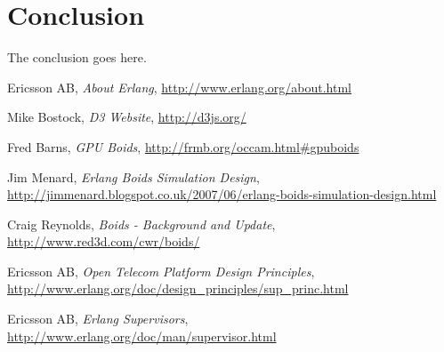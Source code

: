 \documentclass[10pt, a4paper, conference, compsocconf]{IEEEtran}
\begin{document}




\section{Conclusion}
The conclusion goes here.


%
%
%
\begin{thebibliography}{1}


    Ericsson AB,
    \emph{About Erlang},
    \url{http://www.erlang.org/about.html}

    Mike Bostock,
    \emph{D3 Website},
    \url{http://d3js.org/}

    Fred Barns,
    \emph{GPU Boids},
    \url{http://frmb.org/occam.html#gpuboids}

    Jim Menard,
    \emph{Erlang Boids Simulation Design},
    \url{http://jimmenard.blogspot.co.uk/2007/06/erlang-boids-simulation-design.html}

    Craig Reynolds,
    \emph{Boids - Background and Update},
    \url{http://www.red3d.com/cwr/boids/}

    Ericsson AB,
	\emph{Open Telecom Platform Design Principles},
    \url{http://www.erlang.org/doc/design_principles/sup_princ.html}

    Ericsson AB,
	\emph{Erlang Supervisors},
    \url{http://www.erlang.org/doc/man/supervisor.html}

\end{thebibliography}

\end{document}
